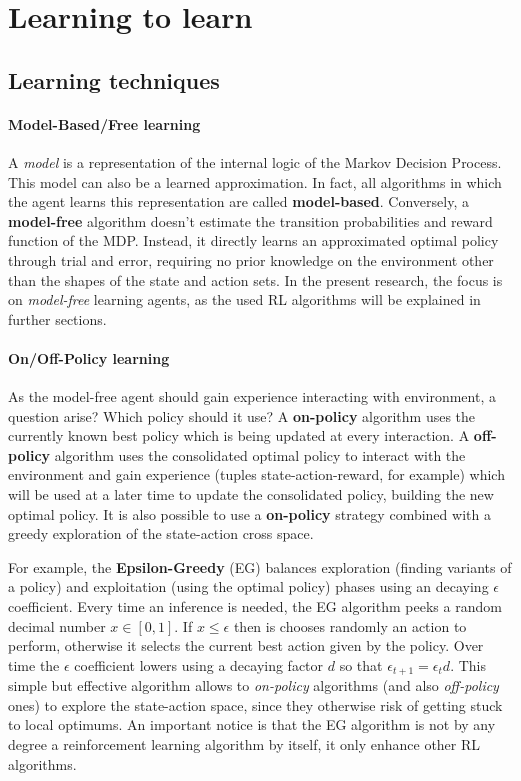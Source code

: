 \section{Learning to learn}

\subsection{Learning techniques}

\paragraph{Model-Based/Free learning}

A \textit{model} is a representation of the internal logic of the Markov Decision Process. This model can also be a learned approximation. In fact, all algorithms in which the agent learns this representation are called \textbf{model-based}. Conversely, a \textbf{model-free} algorithm doesn't estimate the transition probabilities and reward function of the MDP. Instead, it directly learns an approximated optimal policy through trial and error, requiring no prior knowledge on the environment other than the shapes of the state and action sets.
In the present research, the focus is on \textit{model-free} learning agents, as the used RL algorithms will be explained in further sections.

\paragraph{On/Off-Policy learning}

As the model-free agent should gain experience interacting with environment, a question arise? Which policy should it use? A \textbf{on-policy} algorithm uses the currently known best policy which is being updated at every interaction. A \textbf{off-policy} algorithm uses the consolidated optimal policy to interact with the environment and gain experience (tuples state-action-reward, for example) which will be used at a later time to update the consolidated policy, building the new optimal policy. It is also possible to use a \textbf{on-policy} strategy combined with a greedy exploration of the state-action cross space.

For example, the \textbf{Epsilon-Greedy} (EG) \cite{liu2021improving} balances exploration (finding variants of a policy) and exploitation (using the optimal policy) phases using an decaying $\epsilon$ coefficient.
Every time an inference is needed, the EG algorithm peeks a random decimal number $x \in [0, 1]$. If $x \leq \epsilon$ then is chooses randomly an action to perform, otherwise it selects the current best action given by the policy.
Over time the $\epsilon$ coefficient lowers using a decaying factor $d$ so that $\epsilon_{t + 1} = \epsilon_{t} d$. This simple but effective algorithm allows to \textit{on-policy} algorithms (and also \textit{off-policy} ones) to explore the state-action space, since they otherwise risk of getting stuck to local optimums.
An important notice is that the EG algorithm is not by any degree a reinforcement learning algorithm by itself, it only enhance other RL algorithms.

